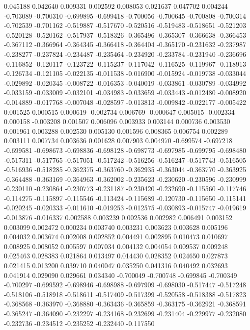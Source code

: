 0.045188
0.042640
0.009331
0.002592
0.008053
0.021637
0.047702
0.004244
-0.703089
-0.700310
-0.699895
-0.699418
-0.700056
-0.700645
-0.700808
-0.700314
-0.702539
-0.701162
-0.519887
-0.517670
-0.520516
-0.519483
-0.518651
-0.521203
-0.520128
-0.520162
-0.517937
-0.518326
-0.365496
-0.365307
-0.366638
-0.366453
-0.367112
-0.366964
-0.364345
-0.366418
-0.364404
-0.365170
-0.231632
-0.237987
-0.238277
-0.237824
-0.234487
-0.235464
-0.234920
-0.233784
-0.231940
-0.236696
-0.116852
-0.120117
-0.123722
-0.115237
-0.117042
-0.116525
-0.119967
-0.118913
-0.126734
-0.121105
-0.022135
-0.011538
-0.016900
-0.015924
-0.019738
-0.033044
-0.029892
-0.020345
-0.008722
-0.016353
-0.040019
-0.033861
-0.030789
-0.034992
-0.033159
-0.033009
-0.032101
-0.034983
-0.033659
-0.033443
-0.012480
-0.008920
-0.014889
-0.017768
-0.007048
-0.028597
-0.013813
-0.009842
-0.022177
-0.005422
0.001525
0.000515
0.000619
-0.002734
0.006769
-0.000647
0.005015
-0.002334
0.000158
-0.003208
0.001507
0.006096
0.003933
0.003144
0.000736
0.003530
0.001961
0.003288
0.002530
0.005130
0.001596
0.008365
0.006754
0.002289
0.003111
0.007734
0.003636
0.001628
0.007903
0.004970
-0.699574
-0.697218
-0.699581
-0.698673
-0.698836
-0.698128
-0.698773
-0.697985
-0.699795
-0.698480
-0.517311
-0.517765
-0.517051
-0.517242
-0.516256
-0.516247
-0.517743
-0.516505
-0.516936
-0.518285
-0.362375
-0.363760
-0.362935
-0.363044
-0.363770
-0.363925
-0.364488
-0.363169
-0.364963
-0.362002
-0.235623
-0.230620
-0.230596
-0.230999
-0.230110
-0.230864
-0.230773
-0.231187
-0.230420
-0.232690
-0.115560
-0.117746
-0.114275
-0.115897
-0.115546
-0.113424
-0.115689
-0.120730
-0.115650
-0.115141
-0.020245
-0.020333
-0.011610
-0.019253
-0.012575
-0.030893
-0.015747
-0.019619
-0.013876
-0.016337
0.002588
0.003239
0.002536
0.002982
0.006491
0.003152
0.003099
0.002472
0.000234
0.003740
0.003231
0.003623
0.003628
0.005196
0.004032
0.003674
0.002008
0.002852
0.004491
0.002895
0.010473
0.010697
0.008925
0.008052
0.005597
0.007034
0.004132
0.004054
0.009537
0.009248
0.025463
0.028383
0.021864
0.013497
0.014430
0.028352
0.024650
0.027873
0.021415
0.013200
0.039710
0.040047
0.035250
0.041316
0.040492
0.032693
0.041914
0.029090
0.029661
0.034340
-0.700049
-0.700748
-0.699845
-0.700349
-0.700297
-0.699592
-0.698946
-0.698988
-0.697909
-0.698030
-0.517447
-0.517248
-0.518106
-0.518918
-0.518611
-0.517409
-0.517399
-0.520558
-0.518388
-0.517823
-0.368568
-0.363970
-0.368880
-0.363436
-0.365859
-0.363175
-0.362921
-0.368591
-0.365247
-0.364090
-0.232297
-0.234168
-0.232699
-0.231404
-0.229977
-0.232080
-0.232736
-0.234512
-0.235252
-0.232440
-0.117550
